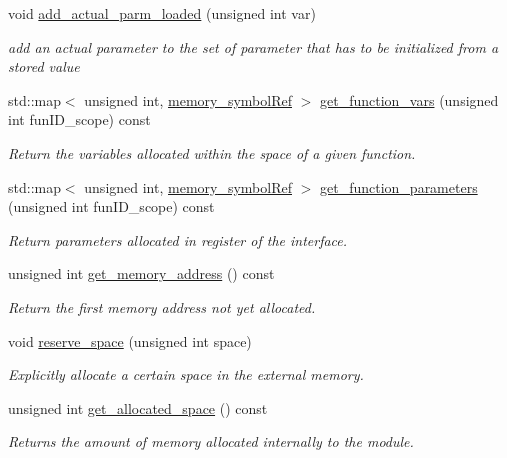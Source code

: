 \begin{DoxyCompactItemize}
void \hyperlink{classmemory_a3df806662ba923a3bf6d8608acae5048}{add\+\_\+actual\+\_\+parm\+\_\+loaded} (unsigned int var)
\begin{DoxyCompactList}\small\item\em add an actual parameter to the set of parameter that has to be initialized from a stored value \end{DoxyCompactList}\item 
std\+::map$<$ unsigned int, \hyperlink{memory__symbol_8hpp_af3608dbc27177447c2d777fa712cc82a}{memory\+\_\+symbol\+Ref} $>$ \hyperlink{classmemory_a6ce2b973f83c743754cfa1bbe1b2a150}{get\+\_\+function\+\_\+vars} (unsigned int fun\+I\+D\+\_\+scope) const
\begin{DoxyCompactList}\small\item\em Return the variables allocated within the space of a given function. \end{DoxyCompactList}\item 
std\+::map$<$ unsigned int, \hyperlink{memory__symbol_8hpp_af3608dbc27177447c2d777fa712cc82a}{memory\+\_\+symbol\+Ref} $>$ \hyperlink{classmemory_a5d64e7ff7e95efad54bbfa07f58e18c1}{get\+\_\+function\+\_\+parameters} (unsigned int fun\+I\+D\+\_\+scope) const
\begin{DoxyCompactList}\small\item\em Return parameters allocated in register of the interface. \end{DoxyCompactList}\item 
unsigned int \hyperlink{classmemory_a510234387e466e099cffb7a6a01ed92f}{get\+\_\+memory\+\_\+address} () const
\begin{DoxyCompactList}\small\item\em Return the first memory address not yet allocated. \end{DoxyCompactList}\item 
void \hyperlink{classmemory_ae5cb10cded037f2d6b8171acb8cba6c9}{reserve\+\_\+space} (unsigned int space)
\begin{DoxyCompactList}\small\item\em Explicitly allocate a certain space in the external memory. \end{DoxyCompactList}\item 
unsigned int \hyperlink{classmemory_aca163291c5d49ad384e5af2f5eb8d20a}{get\+\_\+allocated\+\_\+space} () const
\begin{DoxyCompactList}\small\item\em Returns the amount of memory allocated internally to the module. \end{DoxyCompactList}\item 

\end{DoxyCompactItemize}
